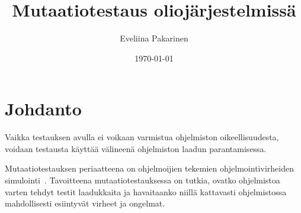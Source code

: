 \documentclass[finnish, grading]{tktltiki2}
\title{Mutaatiotestaus oliojärjestelmissä}
\author{Eveliina Pakarinen}
\date{\today}
\theoremstyle{definition}
\theoremstyle{remark}
\begin{document}

\frontmatter      %

\maketitle        %
\makeabstract     %

\tableofcontents  %


\mainmatter       %




\section{Johdanto}

Vaikka testauksen avulla ei voikaan varmistua ohjelmiston oikeellisuudesta, voidaan testausta käyttää välineenä ohjelmiston laadun parantamisessa. 

Mutaatiotestauksen periaatteena on ohjelmoijien tekemien ohjelmointivirheiden simulointi~\cite[s. 649]{Jia:Harman:2011}. Tavoitteena mutaatiotestauksessa on tutkia, ovatko ohjelmistoa varten tehdyt testit laadukkaita ja havaitaanko niillä kattavasti ohjelmistossa mahdollisesti esiintyvät virheet ja ongelmat. 

%
%
%
\end{document}
